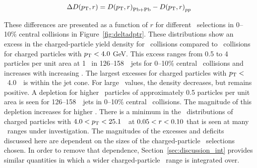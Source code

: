 \begin{align}
\mbox{$\Delta\mbox{$D( \mbox{$p_{\mathrm{T}}$}, r)$}$} = \mbox{$D( \mbox{$p_{\mathrm{T}}$}, r)$}_{\mathrm{Pb+Pb}} - \mbox{$D( \mbox{$p_{\mathrm{T}}$}, r)$}_{pp}
\end{align}

These differences are presented as a function of $r$ for different \pt\ selections in 0--10\% central collisions in Figure~\ref{fig:deltadptr}. 
These distributions show an excess  in the charged-particle yield density for \pbpb\ collisions compared to \pp\ collisions for charged particles with $\mbox{$p_{\mathrm{T}}$} <4.0$ GeV. This excess ranges from 0.5 to 4 particles per unit area at 1 \GeV\ in 126--158~\GeV\ jets for 0--10\% central \pbpb\ collisions and increases with increasing \ptjet. 
The largest excesses for charged particles with $\mbox{$p_{\mathrm{T}}$} <$~4.0~\GeV\ is within the jet cone.  For large \rvar\ values, the
density decreases, but remains positive.
A depletion for higher \pt\ particles of approximately 0.5 particles per unit area is seen for 126--158~\GeV\ jets in 0--10\% central \pbpb\ collisions. The magnitude of this depletion increases for higher \ptjet. 
There is a minimum in the \DeltaDptr\ distributions of charged 
particles with \mbox{$ 4.0 < \mbox{$p_{\mathrm{T}}$} <  25.1$}~\GeV\ at $0.05 < \mbox{$r$} < 0.10$ that is seen at many \ptjet\ ranges under investigation.
The magnitudes of the excesses and deficits discussed here are dependent on the sizes of the charged-particle \pt\ selections
chosen.  In order to remove that dependence, Section~\ref{sec:discussion_int} provides similar quantities in which a
wider charged-particle \pt\ range is integrated over.

